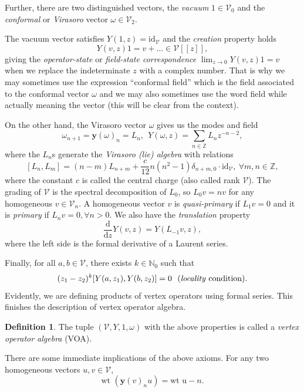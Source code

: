 \documentclass[twoside,11pt,titlepage]{amsart}
\renewcommand{\=}[1]{\stackrel{#1}{=}} %
\theoremstyle{definition}
\newtheorem{dfn}{Definition}
\theoremstyle{remark}
\begin{document}
Further, there are two distinguished vectors, the \textit{vacuum} $1 \in \mathcal{V}_0$ and the \textit{conformal} or \textit{Virasoro} vector $\omega \in \mathcal{V}_2$. 

The vacuum vector satisfies $Y(1,z)=\text{id}_\mathcal{V}$ and the \textit{creation} property holds
$$Y(v,z)1=v+\ldots \in \mathcal{V}[[z]],$$
giving the \textit{operator-state} or \textit{field-state correspondence} $\lim_{z \to 0} Y(v,z)1=v$ when we replace the indeterminate $z$ with a complex number. That is why we may sometimes use the expression ``conformal field'' which is the field associated to the conformal vector $\omega$ and we may also sometimes use the word field while actually meaning the vector (this will be clear from the context). 

On the other hand, the Virasoro vector $\omega$ gives us the modes and field
$$\omega_{n+1}=\textbf{y}(\omega)_n=L_n, \ \ Y(\omega,z)=\sum_{n \in \mathbb{Z}} L_nz^{-n-2},$$
where the $L_n$s generate the \textit{Virasoro (lie) algebra} with relations
$$[L_n,L_m]=(n-m)L_{n+m}+\frac{c}{12}n(n^2-1)\delta_{n+m,0}\cdot \text{id}_\mathcal{V}, \ \forall m,n \in \mathbb{Z},$$
where the constant $c$ is called the central charge (also called rank $\mathcal{V}$). The grading of $\mathcal{V}$ is the spectral decomposition of $L_0$, so $L_0v=n v$ for any homogeneous $v \in \mathcal{V}_n$. A homogeneous vector $v$ is \textit{quasi-primary} if $L_1v=0$ and it is \textit{primary} if $L_nv=0, \forall n>0$. We also have the \textit{translation} property
$$\frac{\text{d}}{\text{d}z}Y(v,z)=Y(L_{-1}v,z),$$
where the left side is the formal derivative of a Laurent series. 

Finally, for all $a,b \in \mathcal{V}$, there exists $k \in \mathbb{N}_0$ such that
$$(z_1-z_2)^k[Y(a,z_1),Y(b,z_2)]=0 \ \ \text{(\textit{locality} condition)}.$$
Evidently, we are defining products of vertex operators using formal series. This finishes the description of vertex operator algebra.
\begin{dfn} \label{dfn1}
The tuple $(\mathcal{V},Y,1,\omega)$ with the above properties is called a \textit{vertex operator algebra} (VOA). 
\end{dfn}

There are some immediate implications of the above axioms. For any two homogeneous vectors $u,v \in \mathcal{V}$,
$$\text{wt }(\textbf{y}(v)_nu)=\text{wt u}-n.$$
\end{document}
